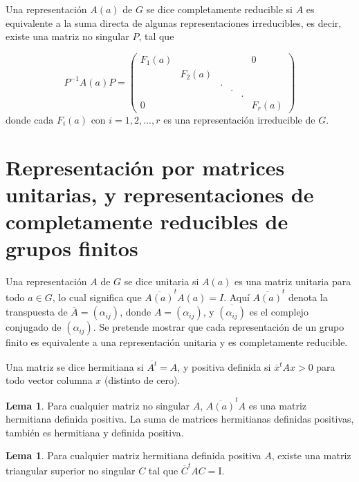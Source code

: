 \documentclass[12pt]{book}
\theoremstyle{definition}
\newtheorem{lemma}[theorem]{Lema}
\newcounter{in}
\newcounter{ini}
\begin{document}
Una representación $A\left(a\right)$ de $G$ se dice completamente
reducible si $A$ es equivalente a la suma directa de algunas
representaciones irreducibles, es decir, existe una matriz no singular
$P$, tal que

\begin{equation*}
 P^{-1}A\left(a\right)P=
 \begin{pmatrix}
   F_{1} \left(a\right) & & & & & 0\\
   & F_{2} \left(a\right) & & & & \\
   & & . & & & \\
   & & & . & & \\
   & & & & . & \\
   0 & & & & & F_{r} \left(a\right)
 \end{pmatrix}
\end{equation*}
donde cada $F_{i}\left(a\right)$ con $i=1,2,...,r$ es una
representación irreducible de $G$.

\section{Representación por matrices unitarias, y
  representaciones de completamente reducibles de grupos finitos}
Una representación $A$ de $G$ se dice unitaria si $A\left(a\right)$ es
una matriz unitaria para todo $a \in G$, lo cual significa que
$\overline{A\left(a\right)}^{t}A\left(a\right)=I$. Aquí
$\overline{A\left(a\right)}^{t}$ denota la transpuesta de
$\overline{A}=\left(\alpha_{ij}\right)$, donde
$A=\left(\alpha_{ij}\right)$, y $\overline{\left(\alpha_{ij}\right)}$
es el complejo conjugado de $\left(\alpha_{ij}\right)$. Se pretende
mostrar que cada representación de un grupo finito es equivalente a
una representación unitaria y es completamente reducible.

Una matriz se dice hermitiana si $\overline{A^{t}}=A$, y positiva
definida si $\overline{x}^{t}Ax>0$ para todo vector columna $x$
(distinto de cero).

\begin{lemma}
  \label{l2_1}
  Para cualquier matriz no singular $A$,
  $\overline{A\left(a\right)}^{t}A$ es una matriz hermitiana definida
  positiva. La suma de matrices hermitianas definidas positivas,
  también es hermitiana y definida positiva.

\end{lemma}

\begin{lemma}
  \label{l2_2}
   Para cualquier matriz hermitiana definida positiva
$A$, existe una matriz triangular superior no singular $C$ tal que
$\overline{C}^{t}AC=\mathrm{I}$.
\end{lemma}
\end{document}
